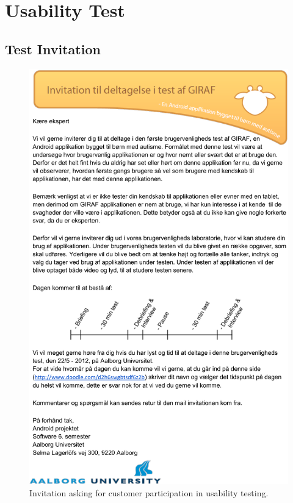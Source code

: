 \chapter{Usability Test}
\label{usability_test}
\section{Test Invitation}
\begin{figure}[h!]
	\centering
	\includegraphics[scale=0.65]{gfx/usabilitytest-invitation.png}
	\caption{Invitation asking for customer participation in usability testing.}
	\label{fig:usability_invitation}
\end{figure}

